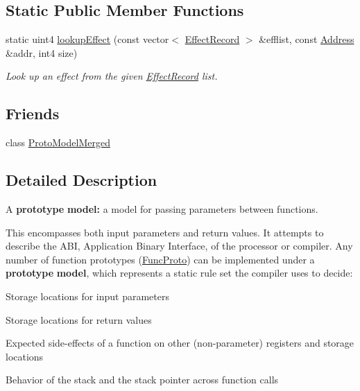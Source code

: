 \subsection*{Static Public Member Functions}
\begin{DoxyCompactItemize}
\item 
static uint4 \mbox{\hyperlink{class_proto_model_aec744a55c36bed8f08fa923fad80df46}{lookup\+Effect}} (const vector$<$ \mbox{\hyperlink{class_effect_record}{Effect\+Record}} $>$ \&efflist, const \mbox{\hyperlink{class_address}{Address}} \&addr, int4 size)
\begin{DoxyCompactList}\small\item\em Look up an effect from the given \mbox{\hyperlink{class_effect_record}{Effect\+Record}} list. \end{DoxyCompactList}\end{DoxyCompactItemize}
\subsection*{Friends}
\begin{DoxyCompactItemize}
\item 
class \mbox{\hyperlink{class_proto_model_a35178d22f44e8a5ab5fcb4d7c9caf25e}{Proto\+Model\+Merged}}
\end{DoxyCompactItemize}


\subsection{Detailed Description}
A {\bfseries{prototype}} {\bfseries{model\+:}} a model for passing parameters between functions. 

This encompasses both input parameters and return values. It attempts to describe the A\+BI, Application Binary Interface, of the processor or compiler. Any number of function prototypes (\mbox{\hyperlink{class_func_proto}{Func\+Proto}}) can be implemented under a {\bfseries{prototype}} {\bfseries{model}}, which represents a static rule set the compiler uses to decide\+:
\begin{DoxyItemize}
\item Storage locations for input parameters
\item Storage locations for return values
\item Expected side-\/effects of a function on other (non-\/parameter) registers and storage locations
\item Behavior of the stack and the stack pointer across function calls
\end{DoxyItemize}

